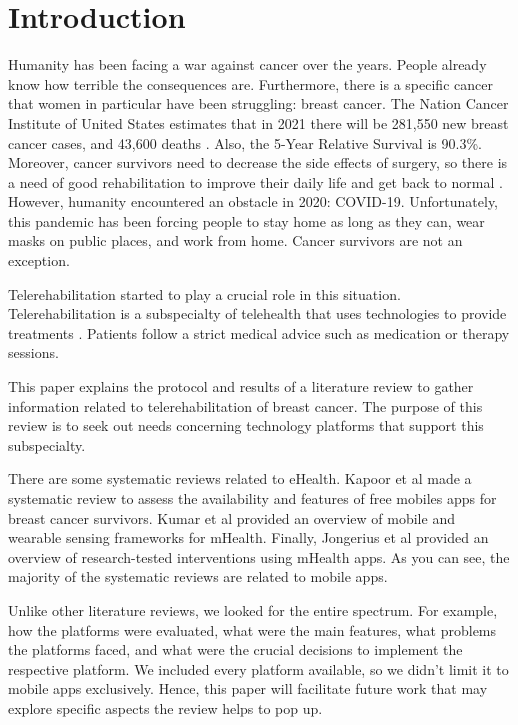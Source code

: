 \documentclass[conference]{IEEEtran}
\begin{document}


\section{Introduction}
Humanity has been facing a war against cancer over the years. People already know how terrible the consequences are. Furthermore, there is a specific cancer that women in particular have been struggling: breast cancer. The Nation Cancer Institute of United States estimates that in 2021 there will be 281,550 new breast cancer cases, and 43,600 deaths \cite{NCI_2021}. Also, the 5-Year Relative Survival is 90.3\%. Moreover, cancer survivors need to decrease the side effects of surgery, so there is a need of good rehabilitation to improve their daily life and get back to normal \cite{de_rezende_telerehabilitation_2021}. However, humanity encountered an obstacle in 2020: COVID-19. Unfortunately, this pandemic has been forcing people to stay home as long as they can, wear masks on public places, and work from home. Cancer survivors are not an exception.

Telerehabilitation started to play a crucial role in this situation. Telerehabilitation is a subspecialty of telehealth that uses technologies to provide treatments \cite{galiano-castillo_agreement_2014, van_der_linden_feasibility_2018}. Patients follow a strict medical advice such as medication or therapy sessions.  

This paper explains the protocol and results of a literature review to gather information related to telerehabilitation of breast cancer. The purpose of this review is to seek out needs concerning technology platforms that support this subspecialty.

There are some systematic reviews related to eHealth. Kapoor et al \cite{kapoor_mobile_2020} made a systematic review to assess the availability and features of free mobiles apps for breast cancer survivors. Kumar et al \cite{kumar_mobile_2021} provided an overview of mobile and wearable sensing frameworks for mHealth. Finally, Jongerius et al \cite{jongerius_research-tested_2019} provided an overview of research-tested interventions using mHealth apps. As you can see, the majority of the systematic reviews are related to mobile apps.

Unlike other literature reviews, we looked for the entire spectrum. For example, how the platforms were evaluated, what were the main features, what problems the platforms faced, and what were the crucial decisions to implement the respective platform. We included every platform available, so we didn't limit it to mobile apps exclusively. Hence, this paper will facilitate future work that may explore specific aspects the review helps to pop up.
\end{document}
